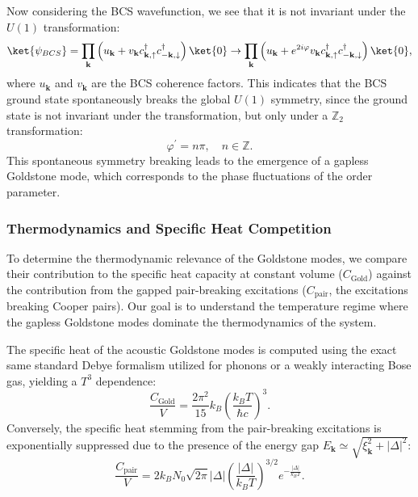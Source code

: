 Now considering the BCS wavefunction, we see that it is not invariant under the \(U(1)\) transformation:
\[
    \ket{\psi_{BCS}} = \prod_{\mathbf{k}} \left( u_{\mathbf{k}} + v_{\mathbf{k}} c_{\mathbf{k},\uparrow}^\dagger c_{-\mathbf{k},\downarrow}^\dagger \right) \ket{0} \to \prod_{\mathbf{k}} \left( u_{\mathbf{k}} + e^{2i\varphi} v_{\mathbf{k}} c_{\mathbf{k},\uparrow}^\dagger c_{-\mathbf{k},\downarrow}^\dagger \right) \ket{0},
\]
where \(u_{\mathbf{k}}\) and \(v_{\mathbf{k}}\) are the BCS coherence factors. This indicates that the BCS ground state spontaneously breaks the global \(U(1)\) symmetry, since the ground state is not invariant under the transformation, but only under a \(\mathbb{Z}_2\) transformation:
\[
    \varphi^{\prime} = n \pi, \quad n \in \mathbb{Z}.
\]
This spontaneous symmetry breaking leads to the emergence of a gapless Goldstone mode, which corresponds to the phase fluctuations of the order parameter.

\subsubsection{Thermodynamics and Specific Heat Competition}

To determine the thermodynamic relevance of the Goldstone modes, we compare their contribution to the specific heat capacity at constant volume (\( C_{\text{Gold}} \)) against the contribution from the gapped pair-breaking excitations (\( C_{\text{pair}} \), the excitations breaking Cooper pairs). Our goal is to understand the temperature regime where the gapless Goldstone modes dominate the thermodynamics of the system.

The specific heat of the acoustic Goldstone modes is computed using the exact same standard Debye formalism utilized for phonons or a weakly interacting Bose gas, yielding a \( T^3 \) dependence:
\[
    \frac{C_{\text{Gold}}}{V} = \frac{2\pi^2}{15} k_B \left( \frac{k_B T}{\hbar c} \right)^3.
\]
Conversely, the specific heat stemming from the pair-breaking excitations is exponentially suppressed due to the presence of the energy gap \( E_{\mathbf{k}} \simeq \sqrt{\xi_{\mathbf{k}}^2 + |\Delta|^2} \):
\[
    \frac{C_{\text{pair}}}{V} = 2k_B N_0 \sqrt{2\pi} |\Delta| \left( \frac{|\Delta|}{k_B T} \right)^{3/2} e^{-\frac{|\Delta|}{k_B T}}.
\]

